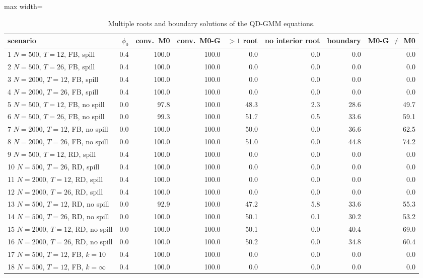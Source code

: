 \begin{table}[!t]
\centering
\caption{Multiple roots and boundary solutions of the QD-GMM equations.}
\label{tab:sim-roots}
\footnotesize
\setlength{\tabcolsep}{3.5pt}
\begin{adjustbox}{max width=\linewidth}
\begin{tabular}{lrrrrrrr}
\toprule
scenario & $\phi_0$ & conv.\ M0 & conv.\ M0-G & $>1$ root & no interior root & boundary & M0-G $\neq$ M0 \\
\midrule
1 $N=500$, $T=12$, FB, spill & 0.4 & 100.0 & 100.0 & 0.0 & 0.0 & 0.0 & 0.0 \\
2 $N=500$, $T=26$, FB, spill & 0.4 & 100.0 & 100.0 & 0.0 & 0.0 & 0.0 & 0.0 \\
3 $N=2000$, $T=12$, FB, spill & 0.4 & 100.0 & 100.0 & 0.0 & 0.0 & 0.0 & 0.0 \\
4 $N=2000$, $T=26$, FB, spill & 0.4 & 100.0 & 100.0 & 0.0 & 0.0 & 0.0 & 0.0 \\
5 $N=500$, $T=12$, FB, no spill & 0.0 & 97.8 & 100.0 & 48.3 & 2.3 & 28.6 & 49.7 \\
6 $N=500$, $T=26$, FB, no spill & 0.0 & 99.3 & 100.0 & 51.7 & 0.5 & 33.6 & 59.1 \\
7 $N=2000$, $T=12$, FB, no spill & 0.0 & 100.0 & 100.0 & 50.0 & 0.0 & 36.6 & 62.5 \\
8 $N=2000$, $T=26$, FB, no spill & 0.0 & 100.0 & 100.0 & 51.0 & 0.0 & 44.8 & 74.2 \\
9 $N=500$, $T=12$, RD, spill & 0.4 & 100.0 & 100.0 & 0.0 & 0.0 & 0.0 & 0.0 \\
10 $N=500$, $T=26$, RD, spill & 0.4 & 100.0 & 100.0 & 0.0 & 0.0 & 0.0 & 0.0 \\
11 $N=2000$, $T=12$, RD, spill & 0.4 & 100.0 & 100.0 & 0.0 & 0.0 & 0.0 & 0.0 \\
12 $N=2000$, $T=26$, RD, spill & 0.4 & 100.0 & 100.0 & 0.0 & 0.0 & 0.0 & 0.0 \\
13 $N=500$, $T=12$, RD, no spill & 0.0 & 92.9 & 100.0 & 47.2 & 5.8 & 33.6 & 55.3 \\
14 $N=500$, $T=26$, RD, no spill & 0.0 & 100.0 & 100.0 & 50.1 & 0.1 & 30.2 & 53.2 \\
15 $N=2000$, $T=12$, RD, no spill & 0.0 & 100.0 & 100.0 & 50.1 & 0.0 & 40.4 & 69.0 \\
16 $N=2000$, $T=26$, RD, no spill & 0.0 & 100.0 & 100.0 & 50.2 & 0.0 & 34.8 & 60.4 \\
17 $N=500$, $T=12$, FB, $k=10$ & 0.4 & 100.0 & 100.0 & 0.0 & 0.0 & 0.0 & 0.0 \\
18 $N=500$, $T=12$, FB, $k=\infty$ & 0.4 & 100.0 & 100.0 & 0.0 & 0.0 & 0.0 & 0.0 \\

\end{tabular}
\end{adjustbox}
\end{table}
